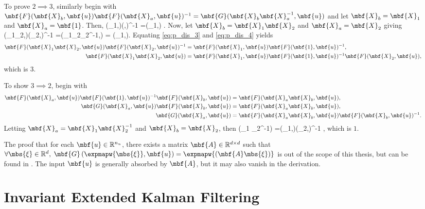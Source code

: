 To prove $2 \implies 3$, similarly begin with  $\mbf{F}(\mbf{X}_b,\mbf{u})\mbf{F}(\mbf{X}_a,\mbf{u})^{-1} =\mbf{G}(\mbf{X}_b\mbf{X}_a^{-1},\mbf{u})$ and let $\mbf{X}_b = \mbf{X}_1$ and $\mbf{X}_a = \mbf{1}$. Then,
\beq
	(_1,)(,)^{-1} =(_1,) \label{eq:p_dis_3}.
\eeq
Now, let  $\mbf{X}_b = \mbf{X}_1\mbf{X}_2$ and $\mbf{X}_a = \mbf{X}_2$ giving
\beq
	(_1_2,)(_2,)^{-1}  =(_1_2_2^{-1},) = (_1,)\label{eq:p_dis_4}.
\eeq
Equating \eqref{eq:p_dis_3} and \eqref{eq:p_dis_4} yields
\begin{align}
	\mbf{F}(\mbf{X}_1\mbf{X}_2,\mbf{u})\mbf{F}(\mbf{X}_2,\mbf{u})^{-1}  & =\mbf{F}(\mbf{X}_1,\mbf{u})\mbf{F}(\mbf{1},\mbf{u})^{-1}, \notag \\
	\mbf{F}(\mbf{X}_1\mbf{X}_2,\mbf{u}) & =\mbf{F}(\mbf{X}_1,\mbf{u})\mbf{F}(\mbf{1},\mbf{u})^{-1}\mbf{F}(\mbf{X}_2,\mbf{u})\notag,
\end{align}
which is $3$.

To show $3 \implies 2$, begin with
\begin{align}
	\mbf{F}(\mbf{X}_a,\mbf{u})\mbf{F}(\mbf{1},\mbf{u})^{-1}\mbf{F}(\mbf{X}_b,\mbf{u}) & =\mbf{F}(\mbf{X}_a\mbf{X}_b,\mbf{u}), \notag \\
	\mbf{G}(\mbf{X}_a,\mbf{u})\mbf{F}(\mbf{X}_b,\mbf{u}) & =\mbf{F}(\mbf{X}_a\mbf{X}_b,\mbf{u}), \notag \\
	\mbf{G}(\mbf{X}_a,\mbf{u}) & =\mbf{F}(\mbf{X}_a\mbf{X}_b,\mbf{u})\mbf{F}(\mbf{X}_b,\mbf{u})^{-1} . \notag
\end{align}
Letting $\mbf{X}_a = \mbf{X}_1 \mbf{X}_2^{-1}$ and $\mbf{X}_b = \mbf{X}_2$, then
\bdis
	\left(_1 _2^{-1}\right) =(_1,)(_2,)^{-1} ,
\edis
which is $1$.

The proof that for each $\mbf{u} \in\mathbb{R}^{n_u}$, there exists a matrix $\mbf{A} \in \mathbb{R}^{d \times d}$  such that $\forall \mbs{\xi} \in \mathbb{R}^d, \;\mbf{G}\left(\expmapw{\mbs{\xi}},\mbf{u}\right) = \expmapw{\left(\mbf{A} \mbs{\xi}\right)}$ is out of the scope of this thesis, but can be found in \cite{Barrau2017}. The input $\mbf{u}$ is generally absorbed by $\mbf{A}$, but it may also vanish in the derivation. 

\section{Invariant Extended Kalman Filtering}

